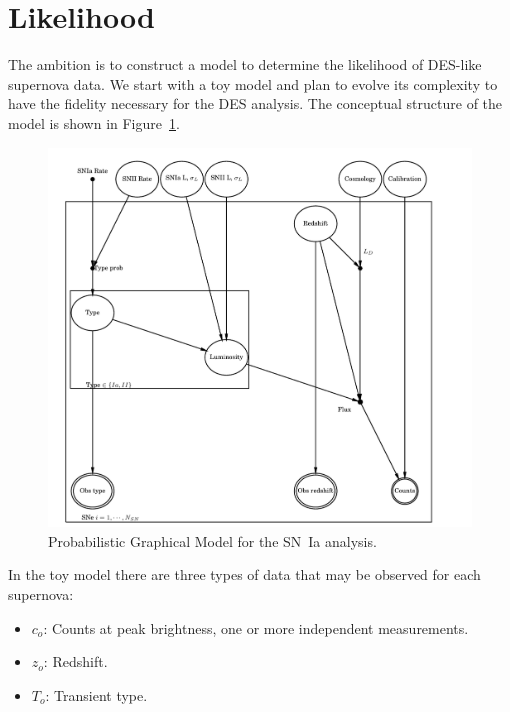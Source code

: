 \documentclass[preprint,3p]{elsarticle}
\begin{document}
%
%

\section{Likelihood}
\label{likelihood:sec}

The ambition is to construct a model to determine the likelihood of DES-like
supernova data.  We start with a toy model and plan to evolve its complexity to
have the fidelity necessary for the DES analysis.
The conceptual structure of the model is shown in Figure~\ref{pgm:fig}. 
\begin{figure}[htbp] %
   \centering
   \includegraphics[width=6.5in]{../results//nodes_pgm.pdf} 
   \caption{Probabilistic Graphical Model for the SN~Ia analysis.  
   \label{pgm:fig}}
\end{figure}

In the toy model there are three types of data that
may be observed for each supernova:
\begin{itemize}
\item $c_o$: Counts at peak brightness, one or more independent measurements.
\item $z_o$: Redshift.
\item $T_o$: Transient type.
\end{itemize}
\end{document}
